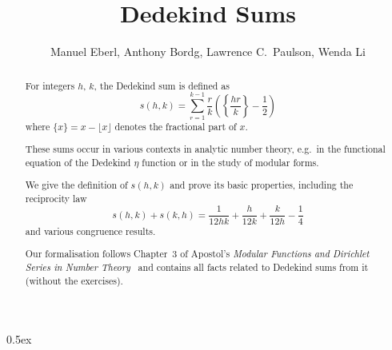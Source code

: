 \documentclass[11pt,a4paper]{article}
\begin{document}
\title{Dedekind Sums}
\author{Manuel Eberl, Anthony Bordg, Lawrence C.\ Paulson, Wenda Li}
\maketitle

\begin{abstract}
For integers $h$, $k$, the Dedekind sum is defined as
\[s(h,k) = \sum_{r=1}^{k-1} \frac{r}{k} \left(\left\{\frac{hr}{k}\right\} - \frac{1}{2}\right) \]
where $\{x\} = x - \lfloor x\rfloor$ denotes the fractional part of $x$.

These sums occur in various contexts in analytic number theory, e.g.\ in the functional
equation of the Dedekind $\eta$ function or in the study of modular forms.

We give the definition of $s(h,k)$ and prove its basic properties, including the reciprocity law
\[s(h,k) + s(k,h) = \frac{1}{12hk} + \frac{h}{12k} + \frac{k}{12h} - \frac{1}{4} \]
and various congruence results.

Our formalisation follows Chapter~3 of Apostol's
\emph{Modular Functions and Dirichlet Series in Number Theory}~\cite{apostol} and contains
all facts related to Dedekind sums from it (without the exercises).
\end{abstract}

\tableofcontents

\newpage
\parindent 0pt\parskip 0.5ex



\raggedright
\nocite{apostol}



\end{document}
